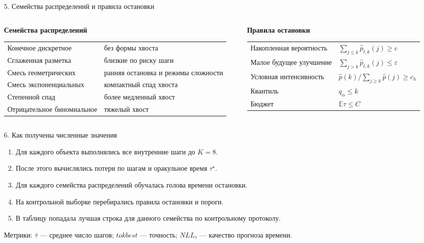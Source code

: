 \documentclass[aspectratio=169,11pt]{beamer}
\newcommand{\smallnote}[1]{{\color{mutedText}\small #1}}
\begin{document}
\begin{frame}{5. Семейства распределений и правила остановки}
\small
\begin{columns}[T,onlytextwidth]
\begin{column}{0.50\textwidth}
\textbf{Семейства распределений}
\vspace{1mm}

\begin{tabularx}{\textwidth}{@{}p{}Y@{}}
\toprule
Конечное дискретное & без формы хвоста \\
Сглаженная разметка & близкие по риску шаги \\
Смесь геометрических & ранняя остановка и режимы сложности \\
Смесь экспоненциальных & компактный спад хвоста \\
Степенной спад & более медленный хвост \\
Отрицательное биномиальное & тяжелый хвост \\
\bottomrule
\end{tabularx}
\end{column}
\begin{column}{0.46\textwidth}
\textbf{Правила остановки}
\vspace{1mm}

\begin{tabularx}{\textwidth}{@{}p{}Y@{}}
\toprule
Накопленная вероятность & $\sum_{j\le k}\widehat p_{t,k}(j)\ge c$ \\
Малое будущее улучшение & $\sum_{j>k}\widehat p_{t,k}(j)\le \varepsilon$ \\
Условная интенсивность & $\widehat p(k)/\sum_{j\ge k}\widehat p(j)\ge c_h$ \\
Квантиль & $q_\alpha\le k$ \\
Бюджет & $\mathbb E\tau\le C$ \\
\bottomrule
\end{tabularx}
\end{column}
\end{columns}
\end{frame}

\begin{frame}{6. Как получены численные значения}
\begin{enumerate}\setlength\itemsep{2.3mm}
\item Для каждого объекта выполнялись все внутренние шаги до $K=8$.
\item После этого вычислялись потери по шагам и оракульное время $\tau^\star$.
\item Для каждого семейства распределений обучалась голова времени остановки.
\item На контрольной выборке перебирались правила остановки и пороги.
\item В таблицу попадала лучшая строка для данного семейства по контрольному протоколу.
\end{enumerate}

\vspace{2mm}
\smallnote{Метрики: $\bar\tau$ — среднее число шагов; $\textit{tokbest}$ — точность; $NLL_\tau$ — качество прогноза времени.}
\end{frame}
\end{document}
